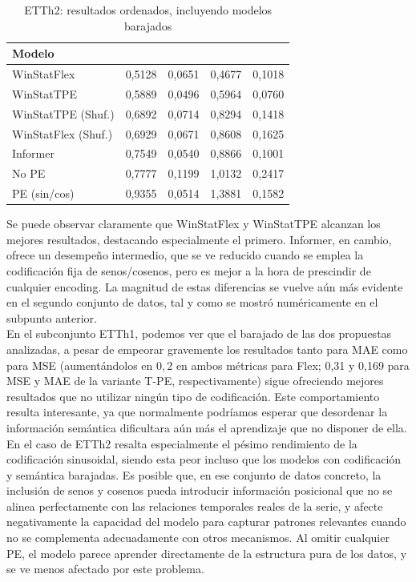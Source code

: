 \begin{table}[ht]
	\centering
	\begin{tabular}{l|N|N|N|N}
		\toprule
		Modelo &  &  &  &  \\
		\midrule
		WinStatFlex            & 0,5128 & 0,0651 & 0,4677 & 0,1018 \\
		WinStatTPE             & 0,5889 & 0,0496 & 0,5964 & 0,0760 \\
		WinStatTPE (Shuf.)     & 0,6892 & 0,0714 & 0,8294 & 0,1418 \\
		WinStatFlex (Shuf.)    & 0,6929 & 0,0671 & 0,8608 & 0,1625 \\
		Informer               & 0,7549 & 0,0540 & 0,8866 & 0,1001 \\
		No PE                  & 0,7777 & 0,1199 & 1,0132 & 0,2417 \\
		PE (sin/cos)           & 0,9355 & 0,0514 & 1,3881 & 0,1582 \\
		\bottomrule
	\end{tabular}
	\caption{ETTh2: resultados ordenados, incluyendo modelos barajados}
	\label{etth2fintab}
\end{table}


Se puede observar claramente que WinStatFlex y WinStatTPE alcanzan los mejores resultados, destacando especialmente el primero. Informer, en cambio, ofrece un desempeño intermedio, que se ve reducido cuando se emplea la codificación fija de senos/cosenos, pero es mejor a la hora de prescindir de cualquier encoding. La magnitud de estas diferencias se vuelve aún más evidente en el segundo conjunto de datos, tal y como se mostró numéricamente en el subpunto anterior.\\

En el subconjunto ETTh1, podemos ver que el barajado de las dos propuestas analizadas, a pesar de empeorar gravemente los resultados tanto para MAE como para MSE (aumentándolos en $0,2$ en ambos métricas para Flex; 0,31 y 0,169 para MSE y MAE de la variante T-PE, respectivamente) sigue ofreciendo mejores resultados que no utilizar ningún tipo de codificación. Este comportamiento resulta interesante, ya que normalmente podríamos esperar que desordenar la información semántica dificultara aún más el aprendizaje que no disponer de ella.\\

En el caso de ETTh2 resalta especialmente el pésimo rendimiento de la codificación sinusoidal, siendo esta peor incluso que los modelos con codificación y semántica barajadas. Es posible que, en ese conjunto de datos concreto, la inclusión de senos y cosenos pueda introducir información posicional que no se alinea perfectamente con las relaciones temporales reales de la serie, y afecte negativamente la capacidad del modelo para capturar patrones relevantes cuando no se complementa adecuadamente con otros mecanismos. Al omitir cualquier PE, el modelo parece aprender directamente de la estructura pura de los datos, y se ve menos afectado por este problema.\\

